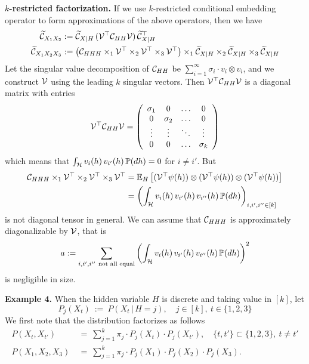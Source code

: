\documentclass[11pt]{article}
\begin{document}
{\bf $k$-restricted factorization.} If we use $k$-restricted conditional embedding operator to form approximations of the above operators, then we have
\begin{align}
  \widetilde {\mathcal{C}}_{X_1X_2} &:= \widetilde {\mathcal{C}}_{X|H}\, (\mathcal{V}^\top \mathcal{C}_{HH} \mathcal{V})\, \widetilde {\mathcal{C}}_{X|H}^\top \\
  \widetilde {\mathcal{C}}_{X_1X_2X_3} &:= \left(\mathcal{C}_{HHH} \times_1 \mathcal{V}^\top \times_2 \mathcal{V}^\top \times_3 \mathcal{V}^\top\right) \times_1 \widetilde {\mathcal{C}}_{X|H} \times_2 \widetilde {\mathcal{C}}_{X|H} \times_3 \widetilde {\mathcal{C}}_{X|H}
\end{align}
Let the singular value decomposition of $\mathcal{C}_{HH}$ be $\sum_{i=1}^{\infty} \sigma_i \cdot v_i \otimes v_i$, and we construct $\mathcal{V}$ using the leading $k$ singular vectors. Then $\mathcal{V}^\top \mathcal{C}_{HH} \mathcal{V}$ is a diagonal matrix with entries
\begin{align}
 \mathcal{V}^\top \mathcal{C}_{HH} \mathcal{V} = \left(
  \begin{array}{cccc}
    \sigma_1 & 0 & \ldots & 0 \cr
    0 & \sigma_2 & \ldots & 0 \cr
    \vdots & \vdots & \ddots & \vdots \cr
    0 & 0 & \ldots & \sigma_k
  \end{array}
 \right)
\end{align}
which means that $\int_{\mathcal{H}} v_i(h)\, v_{i'}(h)\, \mathbb{P}(dh) = 0$ for $i\neq i'$.
But
\begin{align}
 \mathcal{C}_{HHH} \times_1 \mathcal{V}^\top \times_2 \mathcal{V}^\top \times_3 \mathcal{V}^\top
	& = \mathbb{E}_{H} \left[ (\mathcal{V}^\top \psi(h)) \otimes (\mathcal{V}^\top \psi(h)) \otimes (\mathcal{V}^\top \psi(h))\right]  \\
	& = \left( \int_{\mathcal{H}} v_i(h)\, v_{i'}(h)\, v_{i''}(h)\, \mathbb{P}(dh) \right)_{i,i',i'' \in [k]}
\end{align}
is not diagonal tensor in general. We can assume that $\mathcal{C}_{HHH}$ is approximately diagonalizable by $\mathcal{V}$, that is
\begin{align}
 	a := \sum_{i,i',i''~\text{not all equal}} \left(\int_{\mathcal{H}} v_i(h)\, v_{i'}(h)\, v_{i''}(h)\, \mathbb{P}(dh)\right)^2
\end{align}
is negligible in size.

{\bf Example 4.} When the hidden variable $H$ is discrete and taking value in $[k]$, let
\[
 P_j(X_t) \ :=\ P(X_t\, |\, H = j),\quad j \in [k],\ t \in \{1,2,3\}
\]
We first note that the distribution factorizes as follows
\begin{align}
P( X_t, X_{t'} )
\ & =\ \sum_{j=1}^k \pi_j \cdot P_j(X_t) \cdot P_j(X_{t'}),
\quad \{t,t'\} \subset \{1,2,3\} ,\ t \neq t' \label{eq:joint2} \\
P(X_1, X_2, X_3)
\ & =\ \sum_{j=1}^k \pi_j \cdot P_j(X_1) \cdot P_j(X_2) \cdot P_j(X_3). \label{eq:joint3}
\end{align}
\end{document}
